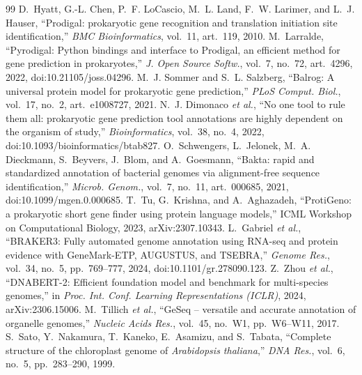 \begin{thebibliography}{99}
 D.~Hyatt, G.-L. Chen, P.~F. LoCascio, M.~L. Land, F.~W. Larimer, and L.~J. Hauser, ``Prodigal: prokaryotic gene recognition and translation initiation site identification,'' \emph{BMC Bioinformatics}, vol.~11, art.~119, 2010.
 M.~Larralde, ``Pyrodigal: Python bindings and interface to Prodigal, an efficient method for gene prediction in prokaryotes,'' \emph{J. Open Source Softw.}, vol.~7, no.~72, art.~4296, 2022, doi:10.21105/joss.04296.
 M.~J. Sommer and S.~L. Salzberg, ``Balrog: A universal protein model for prokaryotic gene prediction,'' \emph{PLoS Comput. Biol.}, vol.~17, no.~2, art.~e1008727, 2021.
 N.~J. Dimonaco \emph{et al.}, ``No one tool to rule them all: prokaryotic gene prediction tool annotations are highly dependent on the organism of study,'' \emph{Bioinformatics}, vol.~38, no.~4, 2022, doi:10.1093/bioinformatics/btab827.
 O.~Schwengers, L.~Jelonek, M.~A. Dieckmann, S.~Beyvers, J.~Blom, and A.~Goesmann, ``Bakta: rapid and standardized annotation of bacterial genomes via alignment-free sequence identification,'' \emph{Microb. Genom.}, vol.~7, no.~11, art.~000685, 2021, doi:10.1099/mgen.0.000685.
 T.~Tu, G.~Krishna, and A.~Aghazadeh, ``ProtiGeno: a prokaryotic short gene finder using protein language models,'' ICML Workshop on Computational Biology, 2023, arXiv:2307.10343.
 L.~Gabriel \emph{et al.}, ``BRAKER3: Fully automated genome annotation using RNA-seq and protein evidence with GeneMark-ETP, AUGUSTUS, and TSEBRA,'' \emph{Genome Res.}, vol.~34, no.~5, pp.~769--777, 2024, doi:10.1101/gr.278090.123.
 Z.~Zhou \emph{et al.}, ``DNABERT-2: Efficient foundation model and benchmark for multi-species genomes,'' in \emph{Proc. Int. Conf. Learning Representations (ICLR)}, 2024, arXiv:2306.15006.
 M.~Tillich \emph{et al.}, ``GeSeq -- versatile and accurate annotation of organelle genomes,'' \emph{Nucleic Acids Res.}, vol.~45, no.~W1, pp.~W6--W11, 2017.
 S.~Sato, Y.~Nakamura, T.~Kaneko, E.~Asamizu, and S.~Tabata, ``Complete structure of the chloroplast genome of \emph{Arabidopsis thaliana},'' \emph{DNA Res.}, vol.~6, no.~5, pp.~283--290, 1999.
\end{thebibliography}
